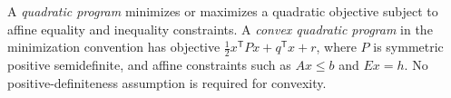 
A \emph{quadratic program} minimizes or maximizes a quadratic objective subject to affine equality and inequality constraints. A \emph{convex quadratic program} in the minimization convention has objective $\frac12x^{\mathsf T}Px+q^{\mathsf T}x+r$, where $P$ is symmetric positive semidefinite, and affine constraints such as $Ax\le b$ and $Ex=h$. No positive-definiteness assumption is required for convexity.
